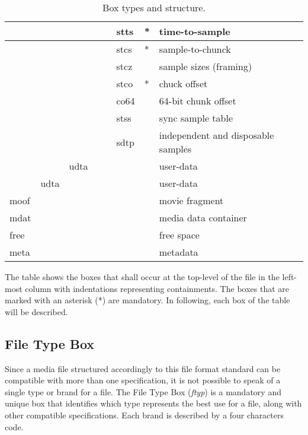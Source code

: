 \begin{table}[]
\begin{tabular}{|l|l|l|l|l|l|l|l|l}
       &      &      &      &      & stts & * & time-to-sample \\ \hline
       &      &      &      &      & stcs & * & sample-to-chunck \\ \hline
       &      &      &      &      & stcz &   & sample sizes (framing) \\ \hline
       &      &      &      &      & stco & * & chuck offset \\ \hline
       &      &      &      &      & co64 &   & 64-bit chunk offset \\ \hline
       &      &      &      &      & stss &   & sync sample table \\ \hline
       &      &      &      &      & sdtp &   & independent and disposable samples \\ \hline
       &      & udta &      &      &      &   & user-data \\ \hline
       & udta &      &      &      &      &   & user-data \\ \hline
  moof &      &      &      &      &      &   & movie fragment \\ \hline
  mdat &      &      &      &      &      &   & media data container \\ \hline
  free &      &      &      &      &      &   & free space \\ \hline
  meta &      &      &      &      &      &   & metadata \\ \hline
\end{tabular}
\caption{Box types and structure.}\label{boxtable}
\end{table}

The table shows the boxes that shall occur at the top-level of the file in the left-most column with indentations representing containments. The boxes that are marked with an asterisk (*) are mandatory. In following, each box of the table will be described.

\subsection*{File Type Box}

Since a media file structured accordingly to this file format standard can be compatible with more than one specification, it is not possible to speak of a single type or brand for a file.
The File Type Box (\emph{ftyp}) is a mandatory and unique box that identifies which type represents the best use for a file, along with other compatible specifications. Each brand is described by a four characters code.


